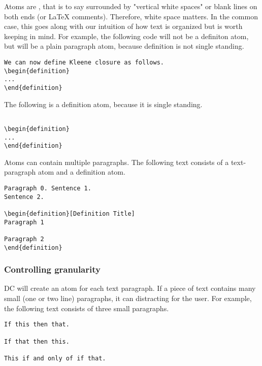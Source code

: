 \begin{important}
Atoms are , that is to say surrounded by "vertical
white spaces" or blank lines on both ends (or LaTeX comments).
%
Therefore,  white space  matters. In the common case, this goes along with our intuition of how text is organized but is worth keeping in mind. For example, the following code will not be a definiton atom, but will be a plain paragraph atom, because definition is not single standing.

\begin{lstlisting}
We can now define Kleene closure as follows.
\begin{definition}
...
\end{definition}
\end{lstlisting}

The following is a definition atom, because it is single standing.
\begin{lstlisting}

\begin{definition}
...
\end{definition}

\end{lstlisting}
\end{important}

\begin{note}
Atoms can contain multiple paragraphs.  The following text consists of a text-paragraph atom and a definition atom.


\begin{lstlisting}
Paragraph 0. Sentence 1.
Sentence 2.

\begin{definition}[Definition Title]
Paragraph 1

Paragraph 2
\end{definition}
\end{lstlisting}
\end{note}

\subsubsection{Controlling granularity}

DC will create an atom for each text paragraph.  If a piece of text contains many small (one or two line) paragraphs, it can distracting for the user.  For example, the following text consists of three small paragraphs.
%
\begin{lstlisting}
If this then that.

If that then this.

This if and only of if that.
\end{lstlisting}

